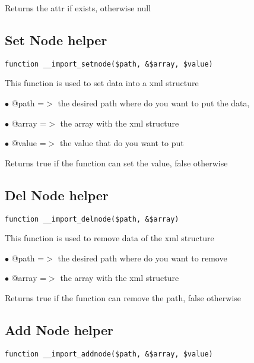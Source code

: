 \documentclass[a4paper]{book}
\begin{document}
Returns the attr if exists, otherwise null

\hypertarget{toc159}{}
\subsection{Set Node helper}

\begin{lstlisting}
function __import_setnode($path, &$array, $value)
\end{lstlisting}

This function is used to set data into a xml structure

\begin{compactitem}
\item[\color{myblue}$\bullet$] @path  =$>$ the desired path where do you want to put the data,
\item[\color{myblue}$\bullet$] @array =$>$ the array with the xml structure
\item[\color{myblue}$\bullet$] @value =$>$ the value that do you want to put
\end{compactitem}

Returns true if the function can set the value, false otherwise

\hypertarget{toc160}{}
\subsection{Del Node helper}

\begin{lstlisting}
function __import_delnode($path, &$array)
\end{lstlisting}

This function is used to remove data of the xml structure

\begin{compactitem}
\item[\color{myblue}$\bullet$] @path  =$>$ the desired path where do you want to remove
\item[\color{myblue}$\bullet$] @array =$>$ the array with the xml structure
\end{compactitem}

Returns true if the function can remove the path, false otherwise

\hypertarget{toc161}{}
\subsection{Add Node helper}

\begin{lstlisting}
function __import_addnode($path, &$array, $value)
\end{lstlisting}
\end{document}
